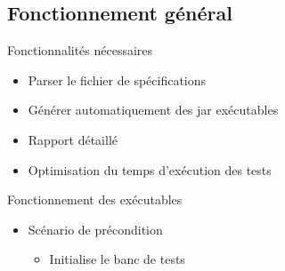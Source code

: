 \documentclass{beamer}
\begin{document}
\subsection{Fonctionnement g\'en\'eral}
\begin{frame}{Fonctionnalités nécessaires}
\vspace{-10px}
	\begin{itemize}[<+->]
		\item Parser le fichier de spécifications
		\item Générer automatiquement des jar exécutables 
		\item Rapport détaillé
		\item Optimisation du temps d'exécution des tests
	\end{itemize}


\end{frame}
\begin{frame}{Fonctionnement des exécutables}
	\begin{itemize}[<+->]
	  \vfill
		\item Scénario de précondition
		\begin{itemize}
			\item Initialise le banc de tests
		\end{itemize}
	\vfill
	\end{itemize}
\end{frame}
\end{document}
